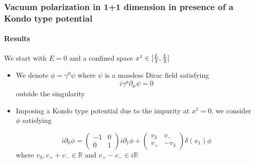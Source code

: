 \documentclass[french]{beamer}
\begin{document}
\begin{frame}[shrink=10]
\frametitle{Vacuum polarization in 1+1 dimension in presence of a Kondo type potential}
\framesubtitle{Results}

We start with $E = 0$ and a confined space $x^1 \in [\-\frac L 2 , \frac L 2]$
\begin{itemize}
\item We denote $\phi = \gamma^0\psi$ where $\psi$ is a massless Dirac field satisfying 
\begin{equation*}
i\gamma^\mu\partial_\mu \psi = 0
\end{equation*}
outside the singularity
\item Imposing a Kondo type potential due to the impurity at $x^1 = 0$,
we consider $\phi$ satisfying

\begin{equation*}
i \partial_0 \phi = 
\begin{pmatrix} 
-1 & 0 \\
0 & 1 
\end{pmatrix} i \partial_1 \phi +
\begin{pmatrix}
v_3 & v_- \\
v_+ & -v_3
\end{pmatrix} \delta(x_1) \phi
\end{equation*}
where $v_3, v_+ + v_- \in \mathbb{R}$ and $ v_+ - v_-\in i \mathbb{R}$
\end{itemize}

\end{frame}
\end{document}
